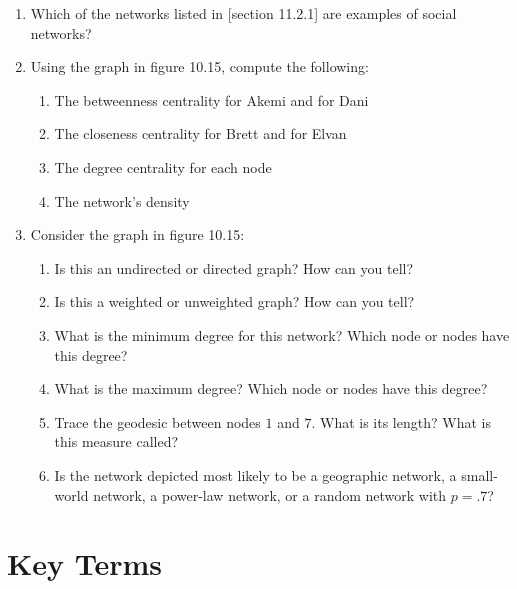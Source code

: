 \documentclass{book}
\begin{document}
\begin{enumerate}
\def\labelenumi{\arabic{enumi}.}
\item
  Which of the networks listed in {[}section 11.2.1{]} are examples of social
  networks?
\item
  Using the graph in figure 10.15, compute the following:

  \begin{enumerate}
  \def\labelenumii{\arabic{enumii}.}
  \item
    The betweenness centrality for Akemi and for Dani
  \item
    The closeness centrality for Brett and for Elvan
  \item
    The degree centrality for each node
  \item
    The network's density
  \end{enumerate}
\item
  Consider the graph in figure 10.15:

  \begin{enumerate}
  \def\labelenumii{\arabic{enumii}.}
  \item
    Is this an undirected or directed graph? How can you tell?
  \item
    Is this a weighted or unweighted graph? How can you tell?
  \item
    What is the minimum degree for this network? Which node or nodes have this
    degree?
  \item
    What is the maximum degree? Which node or nodes have this degree?
  \item
    Trace the geodesic between nodes \(1\) and \(7\). What is its length? What
    is this measure called?
  \item
    Is the network depicted most likely to be a geographic network, a
    small-world network, a power-law network, or a random network with
    \(p = .7\)?
  \end{enumerate}
\end{enumerate}

\hypertarget{key-terms-6}{%
\section{Key Terms}\label{key-terms-6}}
\end{document}
